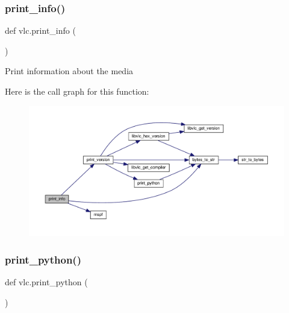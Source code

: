 \subsubsection{\texorpdfstring{print\+\_\+info()}{print\_info()}}
{\footnotesize\ttfamily def vlc.\+print\+\_\+info (\begin{DoxyParamCaption}{ }\end{DoxyParamCaption})}

\begin{DoxyVerb}Print information about the media\end{DoxyVerb}
 Here is the call graph for this function\+:
\nopagebreak
\begin{figure}[H]
\begin{center}
\leavevmode
\includegraphics[width=350pt]{namespacevlc_afdc9487efb7cea9b4f2b1da4a075dc76_cgraph}
\end{center}
\end{figure}
\mbox{\label{namespacevlc_ae0936d317dae71f70be626cab39c5358}} 
\subsubsection{\texorpdfstring{print\+\_\+python()}{print\_python()}}
{\footnotesize\ttfamily def vlc.\+print\+\_\+python (\begin{DoxyParamCaption}{ }\end{DoxyParamCaption})}

